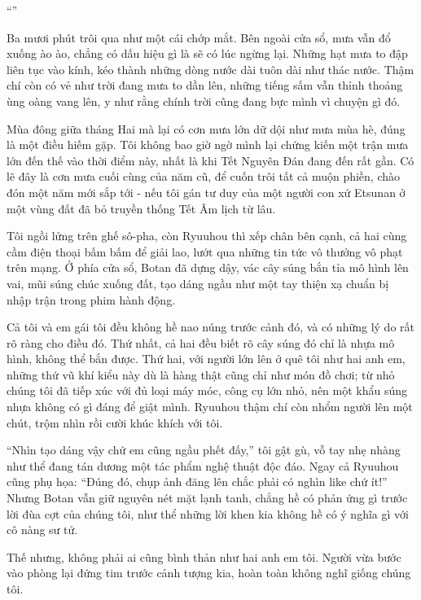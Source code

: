 \documentclass[../main.tex]{subfiles}
\begin{document}
``\textit{}''

\ct

Ba mươi phút trôi qua như một cái chớp mắt. Bên ngoài cửa sổ, mưa vẫn đổ xuống ào ào, chẳng có dấu hiệu gì là sẽ có lúc ngừng lại. Những hạt mưa to đập liên tục vào kính, kéo thành những dòng nước dài tuôn dài như thác nước. Thậm chí còn có vẻ như trời đang mưa to dần lên, những tiếng sấm vẫn thỉnh thoảng ùng oàng vang lên, y như rằng chính trời cũng đang bực mình vì chuyện gì đó.

Mùa đông giữa tháng Hai mà lại có cơn mưa lớn dữ dội như mưa mùa hè, đúng là một điều hiếm gặp. Tôi không bao giờ ngờ mình lại chứng kiến một trận mưa lớn đến thế vào thời điểm này, nhất là khi Tết Nguyên Đán đang đến rất gần. Có lẽ đây là cơn mưa cuối cùng của năm cũ, để cuốn trôi tất cả muộn phiền, chào đón một năm mới sắp tới - nếu tôi gán tư duy của một người con xứ Etsunan ở một vùng đất đã bỏ truyền thống Tết Âm lịch từ lâu.

Tôi ngồi lửng trên ghế sô-pha, còn Ryuuhou thì xếp chân bên cạnh, cả hai cùng cầm điện thoại bấm bấm để giải lao, lướt qua những tin tức vô thưởng vô phạt trên mạng. Ở phía cửa sổ, Botan đã dựng dậy, vác cây súng bắn tỉa mô hình lên vai, mũi súng chúc xuống đất, tạo dáng ngầu như một tay thiện xạ chuẩn bị nhập trận trong phim hành động.


Cả tôi và em gái tôi đều không hề nao núng trước cảnh đó, và có những lý do rất rõ ràng cho điều đó. Thứ nhất, cả hai đều biết rõ cây súng đó chỉ là nhựa mô hình, không thể bắn được. Thứ hai, với người lớn lên ở quê tôi như hai anh em, những thứ vũ khí kiểu này dù là hàng thật cũng chỉ như món đồ chơi; từ nhỏ chúng tôi đã tiếp xúc với đủ loại máy móc, công cụ lớn nhỏ, nên một khẩu súng nhựa không có gì đáng để giật mình. Ryuuhou thậm chí còn nhổm người lên một chút, trộm nhìn rồi cười khúc khích với tôi.

``Nhìn tạo dáng vậy chứ em cũng ngầu phết đấy,'' tôi gật gù, vỗ tay nhẹ nhàng như thể đang tán dương một tác phẩm nghệ thuật độc đáo. Ngay cả Ryuuhou cũng phụ họa: ``Đúng đó, chụp ảnh đăng lên chắc phải có nghìn like chứ ít!'' Nhưng Botan vẫn giữ nguyên nét mặt lạnh tanh, chẳng hề có phản ứng gì trước lời đùa cợt của chúng tôi, như thể những lời khen kia không hề có ý nghĩa gì với cô nàng sư tử.

Thế nhưng, không phải ai cũng bình thản như hai anh em tôi. Người vừa bước vào phòng lại đứng tim trước cảnh tượng kia, hoàn toàn không nghĩ giống chúng tôi.
\end{document}
